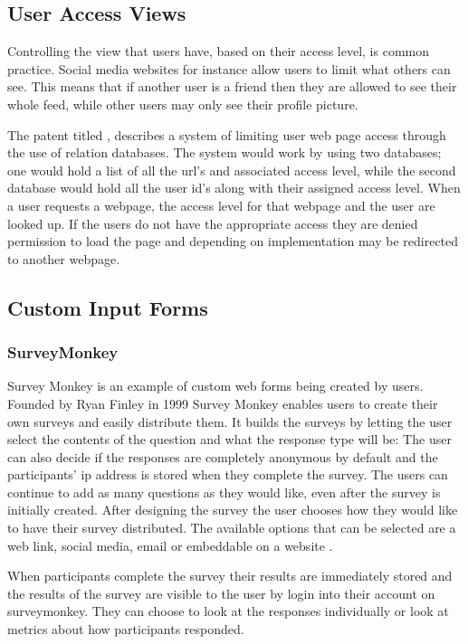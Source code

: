 \documentclass[12pt]{article}  %
\begin{document}
\newpage
\subsection{User Access Views}

Controlling the view that users have, based on their access level, is common practice. Social media websites for instance allow users to limit what others  can see. This means that if another user is a friend then they are allowed to see their whole feed, while other users may only see their profile picture.

The patent titled  \cite{baker_system_1997}, describes a system of limiting user web page access through the use of relation databases. The system would work by using two databases; one would hold a list of all the url's and associated access level, while the second database would hold all the user id's along with their assigned access level. When a user requests a webpage, the access level for that webpage and the user are looked up. If the users do not have the appropriate access they are denied permission to load the page and depending on implementation may be redirected to another webpage.


\subsection{Custom Input Forms}

\subsubsection{SurveyMonkey}
Survey Monkey \cite{finley_surveymonkey_1999} is an example of custom web forms being created by users. Founded by Ryan Finley in 1999 Survey Monkey enables users to create their own surveys and easily distribute them. It builds the surveys by letting the user select the contents of the question and what the response type will be: The user can also decide if the responses are completely anonymous by default and the participants’ ip address is stored when they complete the survey. The users can continue to add as many questions as they would like, even after the survey is initially created. After designing the survey the user chooses how they would like to have their survey distributed. The available options that can be selected are a web link, social media, email or embeddable on a website \cite{waclawski_how_2012} . 

When participants complete the survey their results are immediately stored and the results of the survey are visible to the user by login into their account on surveymonkey. They can choose to look at the responses individually or look at metrics about how participants responded.
\end{document}
